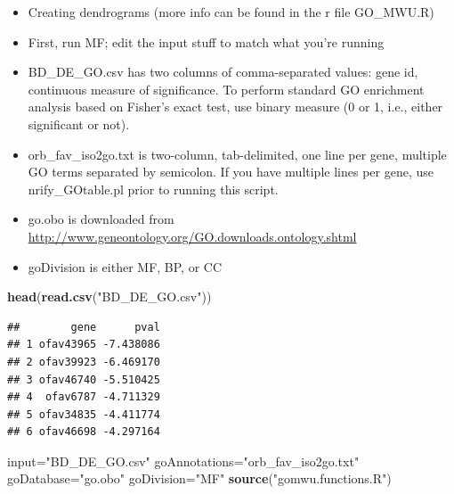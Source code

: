 \documentclass[
]{article}
\newenvironment{Shaded}{\begin{snugshade}}{\end{snugshade}}
\newcommand{\KeywordTok}[1]{\textcolor[rgb]{0.13,0.29,0.53}{\textbf{#1}}}
\newcommand{\NormalTok}[1]{#1}
\newcommand{\StringTok}[1]{\textcolor[rgb]{0.31,0.60,0.02}{#1}}
\providecommand{\tightlist}{%
  \setlength{\itemsep}{0pt}\setlength{\parskip}{0pt}}
\begin{document}
\begin{itemize}
\tightlist
\item
  Creating dendrograms (more info can be found in the r file GO\_MWU.R)
\item
  First, run MF; edit the input stuff to match what you're running
\item
  BD\_DE\_GO.csv has two columns of comma-separated values: gene id,
  continuous measure of significance. To perform standard GO enrichment
  analysis based on Fisher's exact test, use binary measure (0 or 1,
  i.e., either significant or not).
\item
  orb\_fav\_iso2go.txt is two-column, tab-delimited, one line per gene,
  multiple GO terms separated by semicolon. If you have multiple lines
  per gene, use nrify\_GOtable.pl prior to running this script.
\item
  go.obo is downloaded from
  \url{http://www.geneontology.org/GO.downloads.ontology.shtml}
\item
  goDivision is either MF, BP, or CC
\end{itemize}

\begin{Shaded}
\begin{Highlighting}[]
\KeywordTok{head}\NormalTok{(}\KeywordTok{read.csv}\NormalTok{(}\StringTok{"BD_DE_GO.csv"}\NormalTok{))}
\end{Highlighting}
\end{Shaded}

\begin{verbatim}
##        gene      pval
## 1 ofav43965 -7.438086
## 2 ofav39923 -6.469170
## 3 ofav46740 -5.510425
## 4  ofav6787 -4.711329
## 5 ofav34835 -4.411774
## 6 ofav46698 -4.297164
\end{verbatim}

\begin{Shaded}
\begin{Highlighting}[]
\NormalTok{input=}\StringTok{"BD_DE_GO.csv"}
\NormalTok{goAnnotations=}\StringTok{"orb_fav_iso2go.txt"}
\NormalTok{goDatabase=}\StringTok{"go.obo"}
\NormalTok{goDivision=}\StringTok{"MF"}
\KeywordTok{source}\NormalTok{(}\StringTok{"gomwu.functions.R"}\NormalTok{)}
\end{Highlighting}
\end{Shaded}
\end{document}
